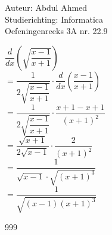 \documentclass[a4paper]{article}
\begin{document}
  
\noindent \large Auteur: Abdul Ahmed \\
\noindent \large Studierichting: Informatica\\
\noindent \large Oefeningenreeks 3A nr. 22.9\\

\medskip

\normalsize


$\dfrac{d}{dx} \left(\sqrt{\dfrac{x-1}{x+1}} \right)$\\

$= \dfrac{1}{2\sqrt{\dfrac{x-1}{x+1}}} \cdot \dfrac{d}{dx}\left(\dfrac{x-1}{x+1}\right)$\\

$= \dfrac{1}{2\sqrt{\dfrac{x-1}{x+1}}} \cdot \dfrac{x+1-x+1}{(x+1)^2}$\\

$= \dfrac{\sqrt{x+1}}{2\sqrt{x-1}} \cdot \dfrac{2}{(x+1)^2}$\\

$= \dfrac{1}{\sqrt{x-1}\cdot \sqrt{(x+1)^3}} $\\

$= \dfrac{1}{\sqrt{(x-1)(x+1)^3}} $\\


\begin{thebibliography}{999}
\end{thebibliography}
\end{document}
